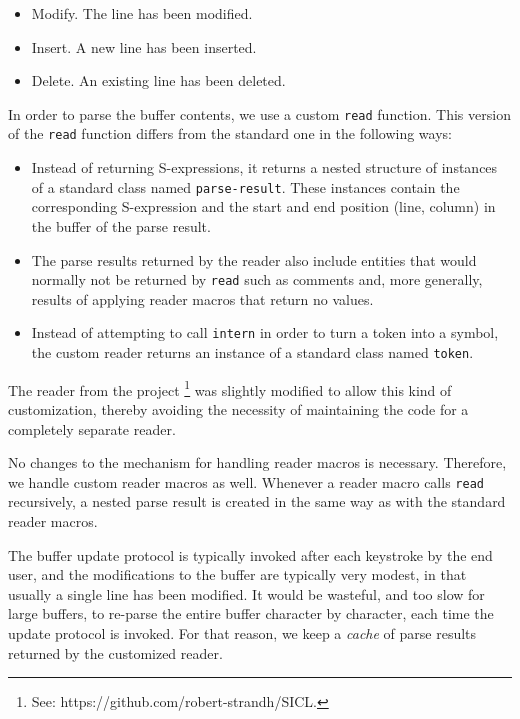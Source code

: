 \begin{itemize}
\item Modify.  The line has been modified.
\item Insert.  A new line has been inserted.
\item Delete.  An existing line has been deleted.
\end{itemize}

In order to parse the buffer contents, we use a custom \texttt{read}
function.  This version of the \texttt{read} function differs from the
standard one in the following ways:

\begin{itemize}
\item Instead of returning S-expressions, it returns a nested
  structure of instances of a standard class named
  \texttt{parse-result}.  These instances contain the corresponding
  S-expression and the start and end position (line, column) in the
  buffer of the parse result.
\item The parse results returned by the reader also include entities
  that would normally not be returned by \texttt{read} such as
  comments and, more generally, results of applying reader macros
  that return no values.
\item Instead of attempting to call \texttt{intern} in order to turn a
  token into a symbol, the custom reader returns an instance of a
  standard class named \texttt{token}.
\end{itemize}

The reader from the \sicl{} project%
\footnote{See: https://github.com/robert-strandh/SICL.}  was slightly
modified to allow this kind of customization, thereby avoiding the
necessity of maintaining the code for a completely separate reader.

No changes to the mechanism for handling reader macros is necessary.
Therefore, we handle custom reader macros as well.  Whenever a reader
macro calls \texttt{read} recursively, a nested parse result is
created in the same way as with the standard reader macros.

The buffer update protocol is typically invoked after each keystroke
by the end user, and the modifications to the buffer are typically
very modest, in that usually a single line has been modified.  It
would be wasteful, and too slow for large buffers, to re-parse the
entire buffer character by character, each time the update protocol is
invoked.  For that reason, we keep a \emph{cache} of parse results
returned by the customized reader.

